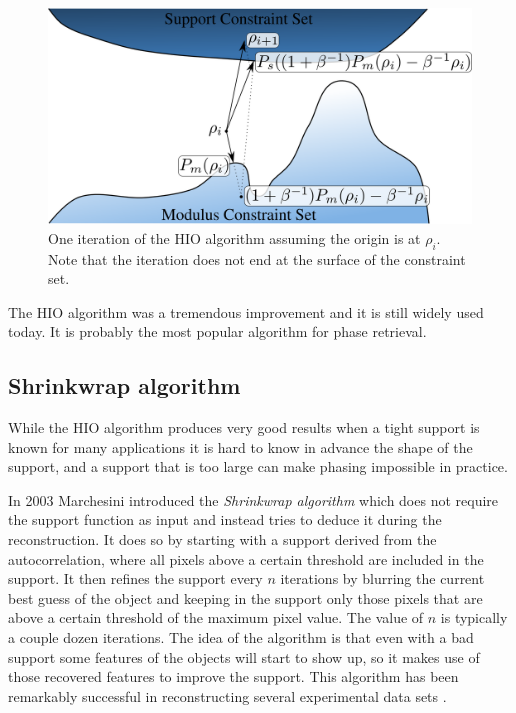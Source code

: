 \begin{figure}[h]
\centering
  \includegraphics[width=0.9 \columnwidth]{Image_Reconstruction/hio_iteration.png}
  \caption{One iteration of the HIO algorithm assuming the origin is at
    $\rho_i$. Note that the iteration does not end at the surface of the
    constraint set.}
  \label{Fig:HIO_Iteration}
\end{figure}

The HIO algorithm was a tremendous improvement and it is still widely used
today. It is probably the most popular algorithm for phase retrieval. 

\subsection{Shrinkwrap algorithm}

While the HIO algorithm produces very good results when a tight support is known
for many applications it is hard to know in advance the shape of the support,
and a support that is too large can make phasing impossible in practice. 

In 2003 Marchesini \cite{Marchesini2003Xray} introduced the {\em Shrinkwrap
  algorithm} which does not require the support function as input and instead
tries to deduce it during the reconstruction. It does so by starting with a
support derived from the autocorrelation, where all pixels above a certain
threshold are included in the support. It then refines the support every $n$
iterations by blurring the current best guess of the object and keeping in the
support only those pixels that are above a certain threshold of the maximum pixel
value. The value of $n$ is typically a couple dozen iterations. The idea of the
algorithm is that even with a bad support some features of the objects will
start to show up, so it makes use of those recovered features to improve the
support. This algorithm has been remarkably successful in reconstructing several
experimental data sets \cite{Chapman2006Femtosecond,Chapman2006Highresolution,Barty2008Ultrafast,Barty2008Threedimensional}.

